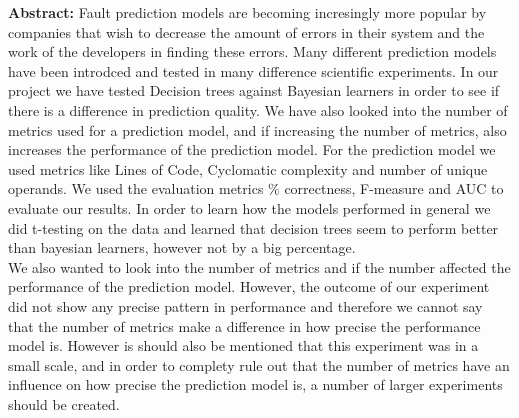 \textbf{Abstract:} Fault prediction models are becoming incresingly more popular by companies that wish to decrease the amount of errors in their system and the work of the developers in finding these errors. Many different prediction models have been introdced and tested in many difference scientific experiments. In our project we have tested Decision trees against Bayesian learners in order to see if there is a difference in prediction quality. We have also looked into the number of metrics used for a prediction model, and if increasing the number of metrics, also increases the performance of the prediction model. For the prediction model we used metrics like Lines of Code, Cyclomatic complexity and number of unique operands. We used the evaluation metrics \% correctness, F-measure and AUC to evaluate our results. In order to learn how the models performed in general we did t-testing on the data and learned that decision trees seem to perform better than bayesian learners, however not by a big percentage. \\ We also wanted to look into the number of metrics and if the number affected the performance of the prediction model. However, the outcome of our experiment did not show any precise pattern in performance and therefore we cannot say that the number of metrics make a difference in how precise the performance model is. However is should also be mentioned that this experiment was in a small scale, and in order to complety rule out that the number of metrics have an influence on how precise the prediction model is, a number of larger experiments should be created. 